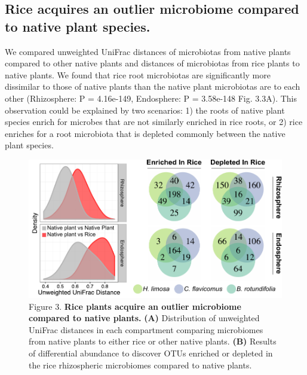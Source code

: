 \subsection{Rice acquires an outlier microbiome compared to native plant species.}

We compared unweighted UniFrac distances of microbiotas from native plants compared to other native plants and distances of microbiotas from rice plants to native plants. We found that rice root microbiotas are significantly more dissimilar to those of native plants than the native plant microbiotas are to each other (Rhizosphere: P = 4.16e-149, Endosphere: P = 3.58e-148 Fig. 3.3A). This observation could be explained by two scenarios: 1) the roots of native plant species enrich for microbes that are not similarly enriched in rice roots, or 2) rice enriches for a root microbiota that is depleted commonly between the native plant species.

\begin{figure}[h]
\centering
\includegraphics[width=5in]{Figures/figure2_3}
\caption[Figure 3.3]{Figure 3. \textbf{Rice plants acquire an outlier microbiome compared to native plants.} \textbf{(A)} Distribution of unweighted UniFrac distances in each compartment comparing microbiomes from native plants to either rice or other native plants. \textbf{(B)} Results of differential abundance to discover OTUs enriched or depleted in the rice rhizospheric microbiomes compared to native plants.}
\label{Figure 3.3}
\end{figure}

